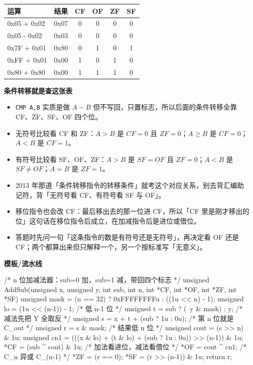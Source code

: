 \documentclass[10pt,a4paper]{ctexart}
\begin{document}
\begin{center}\small
\begin{tabularx}{\linewidth}{@{}>{\raggedright\arraybackslash}Xccccc@{}}
\toprule
运算 & 结果 & CF & OF & ZF & SF \\
\midrule
0x05 + 0x02 & 0x07 & 0 & 0 & 0 & 0 \\
0x05 - 0x02 & 0x03 & 0 & 0 & 0 & 0 \\
0x7F + 0x01 & 0x80 & 0 & 1 & 0 & 1 \\
0xFF + 0x01 & 0x00 & 1 & 0 & 1 & 0 \\
0x80 + 0x80 & 0x00 & 1 & 1 & 1 & 0 \\
\bottomrule
\end{tabularx}
\end{center}

\textbf{条件转移就是查这张表}

\begin{itemize}

\item \texttt{CMP A,B} 实质是做 $A-B$ 但不写回，只置标志，所以后面的条件转移全靠 CF、ZF、SF、OF 四个位。

\item 无符号比较看 CF 和 ZF：$A>B$ 是 $CF=0$ 且 $ZF=0$；$A\ge B$ 是 $CF=0$；$A<B$ 是 $CF=1$。

\item 有符号比较看 SF、OF、ZF：$A>B$ 是 $SF=OF$ 且 $ZF=0$；$A<B$ 是 $SF\ne OF$；$A=B$ 是 $ZF=1$。

\item 2013 年那道「条件转移指令的转移条件」就考这个对应关系，别去背汇编助记符，背「无符号看 CF、有符号看 SF 与 OF」。

\item 移位指令也会改 CF：最后移出去的那一位进 CF，所以「CF 里是刚才移出的位」这句话在移位指令后成立，在加减指令后是进位或借位。

\item 答题时先问一句「这条指令的数是有符号还是无符号」，再决定看 OF 还是 CF；两个都算出来但只解释一个，另一个按标准写「无意义」。

\end{itemize}

\textbf{模板/流水线}

\begin{codebox}
/* n 位加减法器：sub=0 加，sub=1 减，带回四个标志 */
unsigned AddSub(unsigned x, unsigned y, int sub, int n,
                int *CF, int *OF, int *ZF, int *SF) {
    unsigned mask = (n == 32) ? 0xFFFFFFFFu : ((1u << n) - 1);
    unsigned lo   = (1u << (n-1)) - 1;              /* 低 n-1 位 */
    unsigned t    = sub ? (~y & mask) : y;          /* 减法先把 Y 全取反 */
    unsigned s    = x + t + (sub ? 1u : 0u);        /* 第 n 位就是 C_out */
    unsigned r    = s & mask;                       /* 结果低 n 位 */
    unsigned cout = (s >> n) & 1u;
    unsigned cn1  = (((x & lo) + (t & lo) + (sub ? 1u : 0u)) >> (n-1)) & 1u;
    *CF = (sub ^ cout) & 1u;                        /* 加法看进位，减法看借位 */
    *OF = cout ^ cn1;                               /* C_n 异或 C_(n-1) */
    *ZF = (r == 0);
    *SF = (r >> (n-1)) & 1u;
    return r;
}
\end{codebox}
\end{document}
